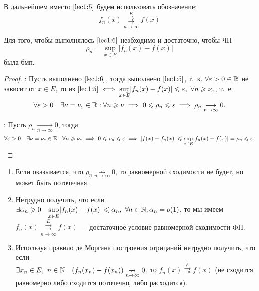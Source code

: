 \documentclass[../../main.tex]{subfiles}
\begin{document}
В дальнейшем вместо $\eqref{lec1:5}$ будем использовать обозначение:
\begin{equation}
\label{lec1:6}
f_n(x) \overset{E}{\underset{n \to \infty}\rightrightarrows} f(x)
\end{equation}
\begin{thm} 
Для того, чтобы выполнялось $\eqref{lec1:6}$ необходимо и достаточно, чтобы
ЧП \begin{equation}
\label{lec1:7}
\rho_n = \underset{x \in E}{\sup}|f_n(x) - f(x)| 
\end{equation} была бмп.
\end{thm}
\begin{proof}
 \;

 \nec: Пусть выполнено $\eqref{lec1:6}$, тогда выполнено $\eqref{lec1:5}$,
 т.~к. $\forall \varepsilon > 0 \in \mathbb{R}$ не зависит от $x \in E$, 
 то из $\eqref{lec1:5} \iff 
 \underset{x \in E}{\sup}|f_n(x) - f(x)| \leq \eps,\ 
 \forall n \geq \nu_\eps$, т.~е.
 \[\forall \varepsilon > 0 \quad \exists \nu = \nu_\varepsilon \in \mathbb{R} : 
 \forall n \geqslant \nu \implies 
 0 \leqslant \rho_n \leqslant \varepsilon \implies 
 \rho_n \underset{n \to \infty}{\longrightarrow}0.\]

 \suff: Пусть $\rho_n \underset{n \to \infty}{\longrightarrow}0$, тогда
\[\forall \varepsilon > 0 \quad \exists \nu = \nu_\varepsilon \in \mathbb{R} :
\forall n \geqslant \nu_\varepsilon \implies  
0 \leqslant \rho_n \leqslant \varepsilon \implies |f(x)-f_n(x)| \leqslant 
\underset{x \in E}{\sup}|f_n(x) - f(x)|
= \rho_n \leqslant \varepsilon. \qedhere\]
\end{proof}

\begin{rem}
	\;
	
 \begin{enumerate}
		\item Если оказывается, что 
$\rho_n \underset{n \to \infty}{\not \rightarrow}0$, 
то равномерной сходимости не будет, но может быть поточечная.

		\item Нетрудно получить, что если $\exists \alpha_n \geqslant 0 \quad 
\underset{x \in E}{\sup}|f_n(x) - f(x)| \leqslant \alpha_n,\ \forall n \in \mathbb{N};
\alpha_n = o(1)$, то мы имеем
$f_n(x) \overset{E}{\underset{n \to \infty}\rightrightarrows} f(x)$ ---
достаточное условие равномерной сходимости ФП.

		\item Используя правило де Моргана 
построения отрицаний нетрудно получить,
что если \\ $\exists x_n \in E,\ n \in \mathbb{N} \quad (f_n(x_n) - f(x_n))
\underset{n \to \infty}{\nrightarrow}0$, то 
$f_n(x) \overset{E}{\not \rightrightarrows} f(x)$ (не сходится 
равномерно либо сходится поточечно, либо расходится).
 \end{enumerate}	
\end{rem}	
\end{document}
